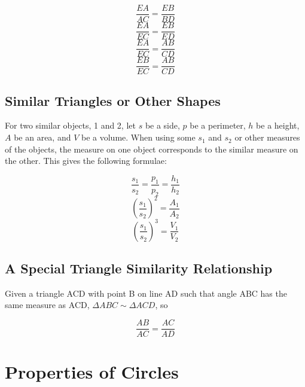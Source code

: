 \documentclass[final, letterpaper, 12pt]{article}
\begin{document}
		\begin{equation}
			\frac{EA}{AC} = \frac{EB}{BD}
		\end{equation}
		\begin{equation}
			\frac{EA}{EC} = \frac{EB}{ED}
		\end{equation}
		\begin{equation}
			\frac{EA}{EC} = \frac{AB}{CD}
		\end{equation}
		\begin{equation}
			\frac{EB}{EC} = \frac{AB}{CD}
		\end{equation}
	
	\subsection{Similar Triangles or Other Shapes}\label{sec: simple proportions between properties of various similar objects}
		For two similar objects, 1 and 2, let $s$ be a side, $p$ be a perimeter, $h$ be a height, $A$ be an area, and $V$ be a volume. When using some $s_1$ and $s_2$ or other measures of the objects, the measure on one object corresponds to the similar measure on the other. This gives the following formulae:
		
		\begin{equation}
			\frac{s_1}{s_2} = \frac{p_1}{p_2} = \frac{h_1}{h_2}
		\end{equation}
		\begin{equation}
			\left(\frac{s_1}{s_2}\right)^2 = \frac{A_1}{A_2}
		\end{equation}
		\begin{equation}
			\left(\frac{s_1}{s_2}\right)^3 = \frac{V_1}{V_2}
		\end{equation}
	
	\subsection{A Special Triangle Similarity Relationship}\label{sec: a common problem about similar triangles}
		Given a triangle ACD with point B on line AD such that angle ABC has the same measure as ACD, $\Delta ABC \sim \Delta ACD$, so 
		
		\begin{equation}
			\frac{AB}{AC} = \frac{AC}{AD}
		\end{equation}
		
\section{Properties of Circles}
\end{document}
